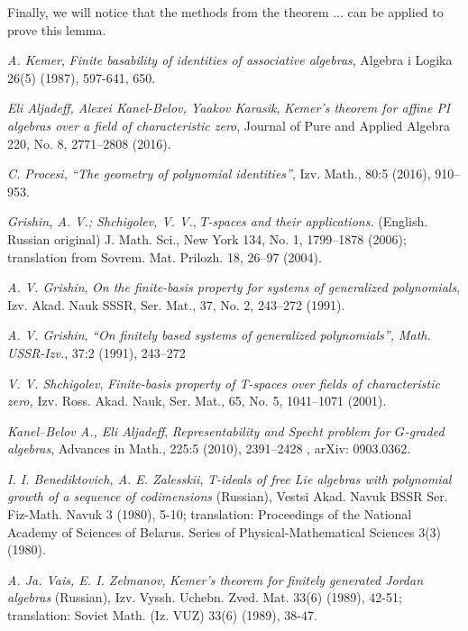 \documentclass[12pt,a4paper]{article}
\begin{document}
    Finally, we will notice that the methods from the theorem ... can be applied to prove this lemma.



    \begin{thebibliography}{10}

         {\sl A. Kemer}, {\it Finite basability of identities of associative algebras}, Algebra i Logika 26(5) (1987), 597-641, 650.

         {\sl Eli Aljadeff, Alexei Kanel-Belov, Yaakov Karasik}, {\it Kemer’s theorem for affine PI algebras over a field of characteristic zero}, Journal of Pure and Applied Algebra 220, No. 8, 2771--2808 (2016).

         {\sl C. Procesi}, {\it “The geometry of polynomial identities”}, Izv. Math., 80:5 (2016), 910–953.

         {\sl Grishin, A. V.; Shchigolev, V. V.}, {\it $T$-spaces and their applications.} (English. Russian original) J. Math. Sci., New York 134, No. 1, 1799--1878 (2006); translation from Sovrem. Mat. Prilozh. 18, 26--97 (2004).

         {\sl A. V. Grishin}, {\it On the finite-basis property for systems of generalized polynomials}, Izv. Akad. Nauk
        SSSR, Ser. Mat., 37, No. 2, 243–272 (1991).

         {\sl A. V. Grishin}, {\it “On finitely based systems of generalized polynomials”, Math. USSR-Izv.}, 37:2 (1991), 243–272

         {\sl V. V. Shchigolev}, {\it Finite-basis property of T-spaces over fields of characteristic zero,} Izv. Ross.
        Akad. Nauk, Ser. Mat., 65, No. 5, 1041–1071 (2001).

         {\sl Kanel–Belov A., Eli Aljadeff}, {\it Representability and Specht problem for $G$-graded algebras}, Advances in Math., 225:5 (2010), 2391--2428 , arXiv: 0903.0362.


         {\sl I. I. Benediktovich, A. E. Zalesskii}, {\it T-ideals of free Lie algebras with polynomial growth of a sequence of codimensions} (Russian), Vestsi Akad. Navuk BSSR Ser. Fiz-Math. Navuk 3 (1980), 5-10; translation: Proceedings of the National
        Academy of Sciences of Belarus. Series of Physical-Mathematical Sciences 3(3) (1980).

         {\sl A. Ja. Vais, E. I. Zelmanov}, {\it Kemer’s theorem for finitely generated Jordan algebras} (Russian), Izv. Vyssh. Uchebn. Zved.
        Mat. 33(6) (1989), 42-51; translation: Soviet Math. (Iz. VUZ) 33(6) (1989), 38-47.


\end{thebibliography}
\end{document}

